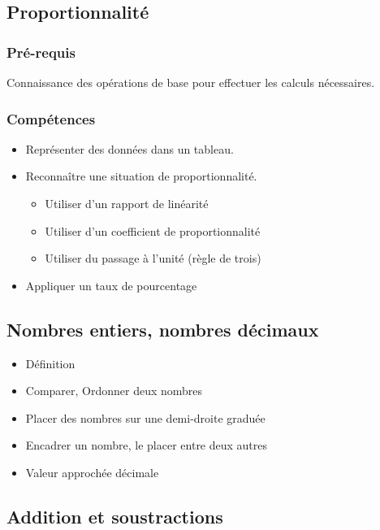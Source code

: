 \subsection{Proportionnalité}

\subsubsection*{Pré-requis}
Connaissance des opérations de base pour effectuer les calculs nécessaires.

\subsubsection*{Compétences}

\begin{itemize}
	\item Représenter des données dans un tableau.
	\item Reconnaître une situation de proportionnalité.
		\begin{itemize}
			\item Utiliser d'un rapport de linéarité
			\item Utiliser d'un coefficient de proportionnalité
			\item Utiliser du passage à l'unité (règle de trois)		
		\end{itemize}
	\item Appliquer un taux de pourcentage
\end{itemize}


\subsection{Nombres entiers, nombres décimaux}

\begin{itemize}
	\item Définition
	\item Comparer, Ordonner deux nombres
	\item Placer des nombres sur une demi-droite graduée
	\item Encadrer un nombre, le placer entre deux autres
	\item Valeur approchée décimale
\end{itemize}


\subsection{Addition et soustractions}

